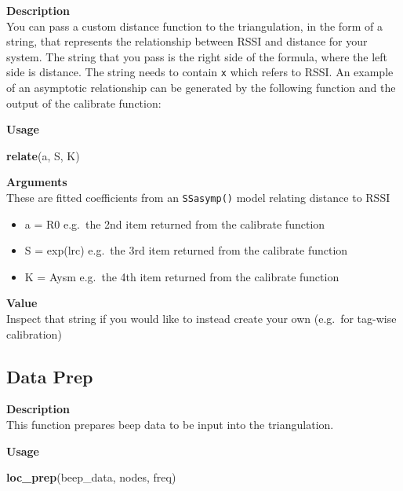 \documentclass[
]{book}
\newenvironment{Shaded}{\begin{snugshade}}{\end{snugshade}}
\newcommand{\FunctionTok}[1]{\textcolor[rgb]{0.13,0.29,0.53}{\textbf{#1}}}
\newcommand{\NormalTok}[1]{#1}
\providecommand{\tightlist}{%
  \setlength{\itemsep}{0pt}\setlength{\parskip}{0pt}}
\begin{document}
\textbf{Description}\\
You can pass a custom distance function to the triangulation, in the form of a string, that represents the relationship between RSSI and distance for your system. The string that you pass is the right side of the formula, where the left side is distance. The string needs to contain \texttt{x} which refers to RSSI. An example of an asymptotic relationship can be generated by the following function and the output of the calibrate function:

\textbf{Usage}

\begin{Shaded}
\begin{Highlighting}[]
\FunctionTok{relate}\NormalTok{(a, S, K)}
\end{Highlighting}
\end{Shaded}

\textbf{Arguments}\\
These are fitted coefficients from an \texttt{SSasymp()} model relating distance to RSSI

\begin{itemize}
\tightlist
\item
  a = R0 e.g.~the 2nd item returned from the calibrate function\\
\item
  S = exp(lrc) e.g.~the 3rd item returned from the calibrate function\\
\item
  K = Aysm e.g.~the 4th item returned from the calibrate function
\end{itemize}

\textbf{Value}\\
Inspect that string if you would like to instead create your own (e.g.~for tag-wise calibration)

\subsection{Data Prep}\label{data-prep}

\textbf{Description}\\
This function prepares beep data to be input into the triangulation.

\textbf{Usage}

\begin{Shaded}
\begin{Highlighting}[]
\FunctionTok{loc\_prep}\NormalTok{(beep\_data, nodes, freq) }
\end{Highlighting}
\end{Shaded}
\end{document}
